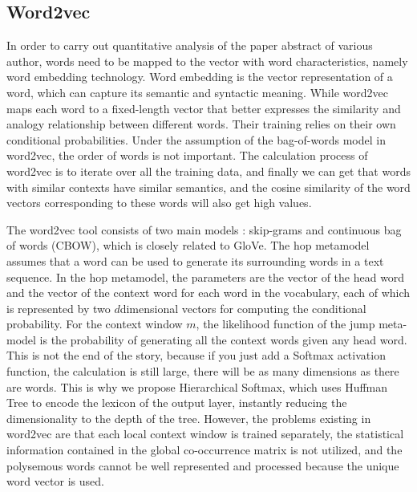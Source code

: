 \documentclass[a4paper]{jpconf}
\begin{document}
\subsection{Word2vec}
In order to carry out quantitative analysis of the paper abstract of
various author, words need to be mapped to the vector with word
characteristics, namely word embedding technology. Word embedding is the
vector representation of a word, which can capture its semantic and
syntactic meaning. While word2vec \cite{7389336} maps each word to a
fixed-length vector that better expresses the similarity \cite{https://doi.org/10.48550/arxiv.2204.04833} and analogy
relationship between different words. Their training relies on their own
conditional probabilities. Under the assumption of the bag-of-words
model in word2vec, the order of words is not important. The calculation
process of word2vec is to iterate over all the training data, and
finally we can get that words with similar contexts have similar
semantics, and the cosine similarity of the word vectors corresponding
to these words will also get high values.

The word2vec tool consists of two main models \cite{7259377}: skip-grams and
continuous bag of words (CBOW), which is closely related to
GloVe. The hop metamodel assumes that a word can be used to generate its
surrounding words in a text sequence. In the hop metamodel, the
parameters are the vector of the head word and the vector of the context
word for each word in the vocabulary, each of which is represented by
two \(d\)dimensional vectors for computing the conditional probability.
For the context window \(m\), the likelihood function of the jump
meta-model is the probability of generating all the context words given
any head word. This is not the end of the story, because if you just add
a Softmax \cite{8852459} activation function, the calculation is still large, there
will be as many dimensions as there are words. This is why we propose
Hierarchical Softmax, which uses Huffman Tree to encode the lexicon of
the output layer, instantly reducing the dimensionality to the depth of
the tree. However, the problems existing in word2vec are that each local
context window is trained separately, the statistical information
contained in the global co-occurrence matrix is not utilized, and the
polysemous words cannot be well represented and processed because the
unique word vector is used.
\end{document}
